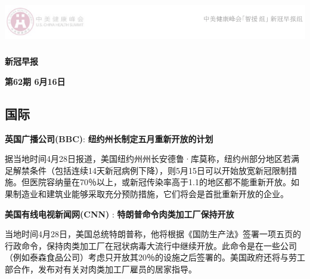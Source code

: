 \documentclass[]{article}
\author{}
\date{\vspace{-2.5em}}
\begin{document}
\fontsize{22}{22}
\selectfont
\vspace{-10truemm}

\newcommand{\resheading}[1]{%
  \noindent\fcolorbox{lavenderblush}{lavenderblush}{\makebox[\dimexpr\textwidth-2\fboxsep-2\fboxrule][l]{\textbf{~#1}}}%
}

\begin{center}
\includegraphics[height=2cm]{./input/logo2.png} 
\end{center}

\begin{center}
\fontsize{45}{45}
\textcolor{glaucous}{\textbf{新冠早报}}
\end{center}

\begin{center}
\fontsize{22}{22}
{\textcolor{glaucous}{\textbf{第62期 \space 6月16日}}}
\end{center}

%
  \noindent{}%

\vspace{-5mm}

\hypertarget{section}{%
\subsection{\texorpdfstring{\textcolor{glaucous}{\Huge 国际}}{}}\label{section}}

\vspace{-3mm}

\textbf{\textcolor{glaucous}{英国广播公司(BBC)}}:
\textbf{纽约州长制定五月重新开放的计划 }

据当地时间4月28日报道，美国纽约州州长安德鲁·库莫称，纽约州部分地区若满足解禁条件（包括连续14天新冠病例下降），则5月15日可以开始放宽新冠限制措施。但医院容纳量在70％以上，或新冠传染率高于1.1的地区都不能重新开放。如果制造业和建筑业能够采取充分预防措施，它们将会是首批重新开放的企业。

\textbf{\textcolor{glaucous}{美国有线电视新闻网(CNN)}} :
\textbf{特朗普命令肉类加工厂保持开放}

当地时间4月28日，美国总统特朗普称，他将根据《国防生产法》签署一项五页的行政命令，保持肉类加工厂在冠状病毒大流行中继续开放。此命令是在一些公司（例如泰森食品公司）考虑只开放其20％的设施之后签署的。美国政府还将与劳工部合作，发布对有关对肉类加工厂雇员的居家指导。
\end{document}
